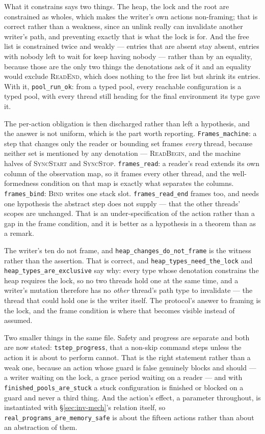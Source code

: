 What it constrains says two things.  The heap, the lock and the root are
constrained as wholes, which makes the writer's own actions non-framing; that
is correct rather than a weakness, since an unlink really can invalidate
another writer's path, and preventing exactly that is what the lock is for.
And the free list is constrained twice and weakly --- entries that are absent
stay absent, entries with nobody left to wait for keep having nobody --- rather
than by an equality, because those are the only two things the denotations ask
of it and an equality would exclude \textsc{ReadEnd}, which does nothing to the
free list but shrink its entries.  With it, \texttt{pool\_run\_ok}: from a
typed pool, every reachable configuration is a typed pool, with every thread
still heading for the final environment its type gave it.

The per-action obligation is then discharged rather than left a hypothesis, and
the answer is not uniform, which is the part worth reporting.
\texttt{Frames\_machine}: a step that changes only the reader or bounding set
frames \emph{every} thread, because neither set is mentioned by any denotation
--- \textsc{ReadBegin}, and the machine halves of \textsc{SyncStart} and
\textsc{SyncStop}.  \texttt{frames\_read}: a reader's read extends its own
column of the observation map, so it frames every other thread, and the
well-formedness condition on that map is exactly what separates the columns.
\texttt{frames\_bind}: \textsc{Bind} writes one stack slot.
\texttt{frames\_read\_end} frames too, and needs one hypothesis the abstract
step does not supply --- that the other threads' scopes are unchanged.  That is
an under-specification of the action rather than a gap in the frame condition,
and it is better as a hypothesis in a theorem than as a remark.

The writer's ten do not frame, and \texttt{heap\_changes\_do\_not\_frame}
is the witness rather than the assertion.  That is correct, and
\texttt{heap\_types\_need\_the\_lock} and
\texttt{heap\_types\_are\_exclusive} say why: every type whose denotation
constrains the heap requires the lock, so no two threads hold one at the same
time, and a writer's mutation therefore has no \emph{other} thread's path type
to invalidate --- the thread that could hold one is the writer itself.  The
protocol's answer to framing is the lock, and the frame condition is where that
becomes visible instead of assumed.

Two smaller things in the same file.  Safety and progress are separate and both
are now stated: \texttt{tstep\_progress}, that a non-skip command steps unless
the action it is about to perform cannot.  That is the right statement rather
than a weak one, because an action whose guard is false genuinely blocks and
should --- a writer waiting on the lock, a grace period waiting on a reader ---
and with \texttt{finished\_pools\_are\_stuck} a stuck configuration is
finished or blocked on a guard and never a third thing.  And the action's
effect, a parameter throughout, is instantiated with
\S\ref{sec:inv-mech}'s relation itself, so
\texttt{real\_programs\_are\_memory\_safe} is about the fifteen actions
rather than about an abstraction of them.

